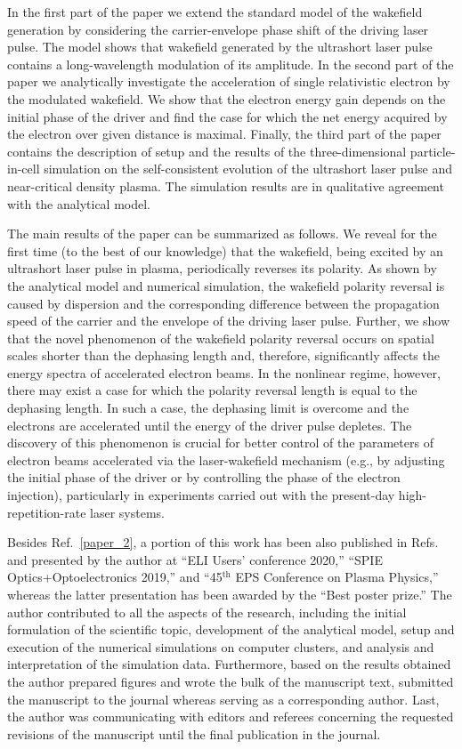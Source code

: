 \documentclass[10pt, a4paper, twoside, openright]{report}
\newcommand{\q}[1]{``#1''} %
\begin{document}
In the first part of the paper we extend the standard model of the wakefield generation by considering the carrier-envelope phase shift of the driving laser pulse. The model shows that wakefield generated by the ultrashort laser pulse contains a long-wavelength modulation of its amplitude. In the second part of the paper we analytically investigate the acceleration of single relativistic electron by the modulated wakefield. We show that the electron energy gain depends on the initial phase of the driver and find the case for which the net energy acquired by the electron over given distance is maximal. Finally, the third part of the paper contains the description of setup and the results of the three-dimensional particle-in-cell simulation on the self-consistent evolution of the ultrashort laser pulse and near-critical density plasma. The simulation results are in qualitative agreement with the analytical model.

The main results of the paper can be summarized as follows. We reveal for the first time (to the best of our knowledge) that the wakefield, being excited by an ultrashort laser pulse in plasma, periodically reverses its polarity. As shown by the analytical model and numerical simulation, the wakefield polarity reversal is caused by dispersion and the corresponding difference between the propagation speed of the carrier and the envelope of the driving laser pulse. Further, we show that the novel phenomenon of the wakefield polarity reversal occurs on spatial scales shorter than the dephasing length and, therefore, significantly affects the energy spectra of accelerated electron beams. In the nonlinear regime, however, there may exist a case for which the polarity reversal length is equal to the dephasing length. In such a case, the dephasing limit is overcome and the electrons are accelerated until the energy of the driver pulse depletes. The discovery of this phenomenon is crucial for better control of the parameters of electron beams accelerated via the laser-wakefield mechanism (e.g., by adjusting the initial phase of the driver or by controlling the phase of the electron injection), particularly in experiments carried out with the present-day high-repetition-rate laser systems.

Besides Ref.~\ref{paper_2}, a portion of this work has been also published in Refs.~ and presented by the author at \q{ELI Users' conference 2020,} \q{SPIE Optics+Optoelectronics 2019,} and \q{45$ ^{\mathrm{th}} $ EPS Conference on Plasma Physics,} whereas the latter presentation has been awarded by the \q{Best poster prize.} The author contributed to all the aspects of the research, including the initial formulation of the scientific topic, development of the analytical model, setup and execution of the numerical simulations on computer clusters, and analysis and interpretation of the simulation data. Furthermore, based on the results obtained the author prepared figures and wrote the bulk of the manuscript text, submitted the manuscript to the journal whereas serving as a corresponding author. Last, the author was communicating with editors and referees concerning the requested revisions of the manuscript until the final publication in the journal.
\end{document}
